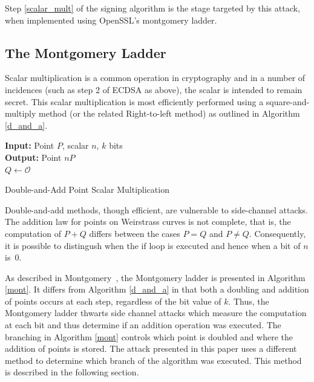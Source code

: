 \documentclass[twocolumn]{svjour3}
\begin{document}
Step \ref{scalar_mult} of the signing algorithm is the stage targeted by this attack, when implemented using OpenSSL's montgomery ladder. %

\subsection{The Montgomery Ladder}\label{sub:montgomery}
Scalar multiplication is a common operation in cryptography and in a number of incidences (such as step 2 of ECDSA as above), the scalar is intended to remain secret. This scalar multiplication is most efficiently performed using a square-and-multiply method (or the related Right-to-left method) as outlined in Algorithm \ref{d_and_a}.\\

\vspace{-0.8cm}
\begin{algorithm}[htb]\label{d_and_a}
\SetAlgoLined
{\bf Input:} Point $P$, scalar $n$, $k$ bits\\
{\bf Output:} Point $nP$\\
$Q\gets \mathcal{O}$\\
 \caption{Double-and-Add Point Scalar Multiplication}
\end{algorithm}\vspace{-0.5cm}
Double-and-add methods, though efficient, are vulnerable to side-channel attacks. %
The addition law for points on Weirstrass curves is not complete, that is, the computation of $P+Q$ differs between the cases $P=Q$ and $P\neq Q.$ Consequently, 
it is possible to distingush when the if loop is executed and hence when a bit of $n$ is~0.

As described in Montgomery~\cite{montgomery87speeding}, the Montgomery ladder is presented in Algorithm \ref{mont}. It differs from Algorithm \ref{d_and_a} in that both a doubling and addition of points occurs at each step, regardless of the bit value of $k$. Thus, the Montgomery ladder thwarts side channel attacks which measure the computation at each bit and thus determine if an addition operation was executed. The branching in Algorithm \ref{mont} controls which point is doubled and where the addition of points is stored. The attack presented in this paper uses a different method to determine which branch of the algorithm was executed.
This method is described in the following section.
\end{document}
